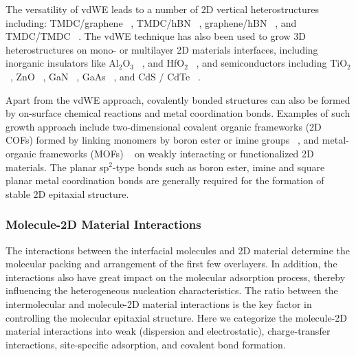 The versatility of vdWE leads to a number of 2D vertical
heterostructures including: TMDC/graphene
~\autocite{Shi_2012_vdw_epi_MoS2_gr,Liu_2016_epi_MoS2_gr_rotation,Lin_2014_vdW_solid,Lin_2015_Wse2_MoS2_gr,Azizi_2015_Freevdw_Gr_TMDCs,Kim_2016_BiSnTe_gr},
TMDC/hBN
~\autocite{Yan_2015_MoS2_on_hBN,Wang_2015_cvd_MoS2_BN,Cattelan_2015_Ws2_hBN},
graphene/hBN
~\autocite{Liu_2011_gr_hBN,Zhang_2015_gr_hBN,Driver_2016_MBE_gr_hBN}, and
TMDC/TMDC
~\autocite{Zhang_2014_vdw_epi_SnS2_MoS2,Diaz_2015_MoTe2_MoSe2,Gong_2014_WS2_MoS2,Alemayehu_2015_TMDC_vdw}.
%
The vdWE technique has also been used to grow 3D heterostructures on
mono- or multilayer 2D materials interfaces, including inorganic
insulators like Al\(_{\text{2}}\)O\(_{\text{3}}\)
~\autocite{Zhang_2014_Al2O3_ALO_Gr,Vaziri_2013_ALD_Al2O3_gr}, and
HfO\(_{\text{2}}\) ~\autocite{Alaboson_2011_PTCDA_gr_ALD},
%
and semiconductors including TiO\(_{\text{2}}\)
~\autocite{Li_2015_TiO2_GO,Kumar_2011_TiO2_piezo_gr,Zhang_2011_TiO2_gr},
ZnO ~\autocite{Chung_2010_GaN_ZnO_gr,Oh_2014_ZnO_hBN}, GaN
~\autocite{Kobayashi_2012_GaN_hBN,Kim_2014_direct_vdw_GaN_gr,Kim_2017_remote_epi_Gr},
GaAs
~\autocite{Alaskar_2015_GaAs_gr_Si_theor,Kim_2017_remote_epi_Gr,Kong_2018_vdw_polar}, and CdS / CdTe
~\autocite{Loeher_1994_vdw_epi_CdS_MoTe,Loeher_1996_CdTe_MoWTe}.

Apart from the vdWE approach, covalently bonded structures can also be
formed by on-surface chemical reactions and metal coordination
bonds. Examples of such growth approach include two-dimensional
covalent organic frameworks (2D COFs) formed by linking monomers by
boron ester or imine groups
~\autocite{Colson_2014_2D_COF_gr,Colson_2011_2DMOF_gr,Sun_2017_COF_VFET},
and metal-organic frameworks (MOFs)
~\autocite{Urgel_2015_MOF_BN,Kumar_2014_2D_MOF_gr} on weakly interacting
or functionalized 2D materials. The planar sp$^{2}$-type bonds such as
boron ester, imine and square planar metal coordination bonds are
generally required for the formation of stable 2D epitaxial structure.

\subsubsection{Molecule-2D Material Interactions}
\label{sec:intro-mol-2D}

The interactions between the interfacial molecules and 2D material
determine the molecular packing and arrangement of the first few
overlayers. In addition, the interactions also have great impact on
the molecular adsorption process, thereby influencing the
heterogeneous nucleation characteristics. The
ratio between the intermolecular and molecule-2D material
interactions is the key factor in controlling the molecular epitaxial
structure. Here we categorize the molecule-2D material interactions
into weak (dispersion and electrostatic), charge-transfer
interactions, site-specific adsorption, and covalent bond formation.

